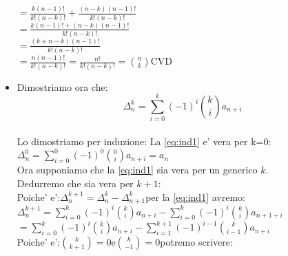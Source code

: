 \documentclass[12pt,a4paper]{article}
\begin{document}
\begin{flushleft}
\begin{itemize}
{\hspace{53.3mm}$=\frac{k(n-1)!}{k!(n-k)!} + \frac{(n-k)(n-1)!}{k!(n-k)!}$\\
\vspace{5mm}
\hspace{53.3mm}$=\frac{k(n-1)!+(n-k)(n-1)!}{k!(n-k)!}$\\
\vspace{5mm}
\hspace{53.3mm}$=\frac{(k+n-k)(n-1)!}{k!(n-k)!}$\\
\vspace{5mm}
\hspace{53.3mm}$=\frac{n(n-1)!}{k!(n-k)!}=\frac{n!}{k!(n-k)!}=\binom{n}{k}$\hspace{10mm}CVD\\
}
\item{
Dimostriamo ora che:\\
\begin{equation}
\label{eq:ind1}
\Delta_n^k=\sum_{i=0}^{k}(-1)^{i}\binom{k}{i}a_{n+i}
\end{equation}
\\
\vspace{5mm}
Lo dimostriamo per induzione:
\vspace{5mm}
La \eqref{eq:ind1} e' vera per k=0:\hspace{14mm}$\Delta_n^0=\sum_{i=0}^{0}(-1)^{0}\binom{0}{i}a_{n+i}=a_n$\\
\vspace{5mm}
Ora supponiamo che la \eqref{eq:ind1} sia vera per un generico $k$.\\
\vspace{5mm}
Dedurremo che sia vera per $k+1$:\\
\vspace{5mm}
Poiche' e':\hspace{5mm}$\Delta_n^{k+1}=\Delta_{n}^k - \Delta_{n+1}^k$\hspace{5mm}per la \eqref{eq:ind1} avremo:\\
\vspace{5mm}
$\Delta_n^{k+1}=\sum_{i=0}^{k}(-1)^{i}\binom{k}{i}a_{n+i}-\sum_{i=0}^{k}(-1)^{i}\binom{k}{i}a_{n+1+i}$\\
\vspace{5mm}
\hspace{10mm}$=\sum_{i=0}^{k}(-1)^{i}\binom{k}{i}a_{n+i}-\sum_{i=1}^{k+1}(-1)^{i-1}\binom{k}{i-1}a_{n+i}$\\
\vspace{5mm}
Poiche' e':\hspace{5mm}$\binom{k}{k+1}=0$\hspace{5mm}e$\binom{k}{-1}=0$\hspace{5mm}\hspace{5mm}potremo scrivere:\\
}
\end{itemize}
\end{flushleft}
\end{document}
